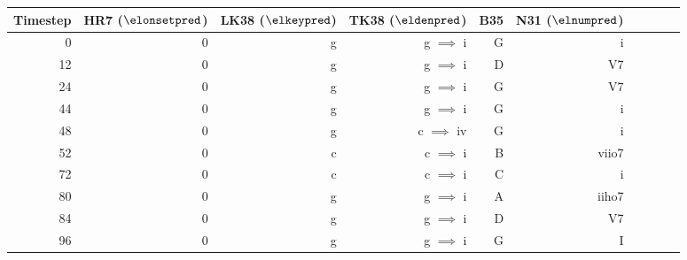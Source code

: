 \begin{tabular}{r|rrrrrrrrr}
Timestep & HR7 ($\elonsetpred$) & LK38 ($\elkeypred$) & TK38
($\eldenpred$) & B35  & N31 ($\elnumpred$)  \\ \hline
0        & 0   & g    & g $\implies$ i    & G     & i     \\
12       & 0   & g    & g $\implies$ i    & D     & V7    \\
24       & 0   & g    & g $\implies$ i    & G     & V7    \\
44       & 0   & g    & g $\implies$ i    & G     & i     \\ \hline
48       & 0   & g    & c $\implies$ iv   & G     & i     \\
52       & 0   & c    & c $\implies$ i    & B     & viio7 \\
72       & 0   & c    & c $\implies$ i    & C     & i     \\
80       & 0   & g    & g $\implies$ i    & A     & iiho7 \\
84       & 0   & g    & g $\implies$ i    & D     & V7    \\
96       & 0   & g    & g $\implies$ i    & G     & I     \\
\end{tabular}
